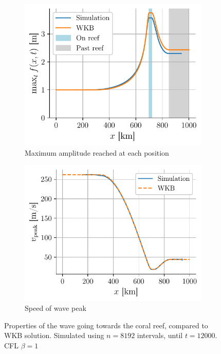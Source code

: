 \begin{figure}[h]
    \centering
    \begin{subfigure}{0.48\linewidth}
        \centering
        \includegraphics[width=\linewidth]{figures/corail_eq1_amplitude_wkb.pdf}
        \caption{Maximum amplitude reached at each position}
        \label{fig:corail_eq1_amplitude}
    \end{subfigure}
    \begin{subfigure}{0.48\linewidth}
        \centering
        \includegraphics[width=\linewidth]{figures/corail_eq1_vitesse_wkb.pdf}
        \caption{Speed of wave peak}
        \label{fig:corail_eq1_vitesse}
    \end{subfigure}
    \caption{Properties of the wave going towards the coral reef, compared to WKB solution. Simulated using \(n=8192\) intervals, until \(t=12000\). CFL \(\beta=1\)}
    \label{fig:corail_eq1_properties}
\end{figure}

